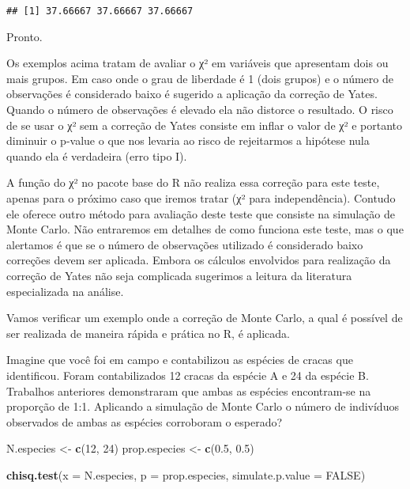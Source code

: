\documentclass[]{book}
\newenvironment{Shaded}{\begin{snugshade}}{\end{snugshade}}
\newcommand{\DataTypeTok}[1]{\textcolor[rgb]{0.13,0.29,0.53}{#1}}
\newcommand{\DecValTok}[1]{\textcolor[rgb]{0.00,0.00,0.81}{#1}}
\newcommand{\FloatTok}[1]{\textcolor[rgb]{0.00,0.00,0.81}{#1}}
\newcommand{\KeywordTok}[1]{\textcolor[rgb]{0.13,0.29,0.53}{\textbf{#1}}}
\newcommand{\NormalTok}[1]{#1}
\newcommand{\OtherTok}[1]{\textcolor[rgb]{0.56,0.35,0.01}{#1}}
\newcommand{\StringTok}[1]{\textcolor[rgb]{0.31,0.60,0.02}{#1}}
\begin{document}
\begin{verbatim}
## [1] 37.66667 37.66667 37.66667
\end{verbatim}

Pronto.

Os exemplos acima tratam de avaliar o χ² em variáveis que apresentam dois ou mais grupos. Em caso onde o grau de liberdade é 1 (dois grupos) e o número de observações é considerado baixo é sugerido a aplicação da correção de Yates. Quando o número de observações é elevado ela não distorce o resultado. O risco de se usar o χ² sem a correção de Yates consiste em inflar o valor de χ² e portanto diminuir o p-value o que nos levaria ao risco de rejeitarmos a hipótese nula quando ela é verdadeira (erro tipo I).

A função do χ² no pacote base do R não realiza essa correção para este teste, apenas para o próximo caso que iremos tratar (χ² para independência). Contudo ele oferece outro método para avaliação deste teste que consiste na simulação de Monte Carlo. Não entraremos em detalhes de como funciona este teste, mas o que alertamos é que se o número de observações utilizado é considerado baixo correções devem ser aplicada. Embora os cálculos envolvidos para realização da correção de Yates não seja complicada sugerimos a leitura da literatura especializada na análise.

Vamos verificar um exemplo onde a correção de Monte Carlo, a qual é possível de ser realizada de maneira rápida e prática no R, é aplicada.

Imagine que você foi em campo e contabilizou as espécies de cracas que identificou. Foram contabilizados 12 cracas da espécie A e 24 da espécie B. Trabalhos anteriores demonstraram que ambas as espécies encontram-se na proporção de 1:1. Aplicando a simulação de Monte Carlo o número de indivíduos observados de ambas as espécies corroboram o esperado?

\begin{Shaded}
\begin{Highlighting}[]
\NormalTok{N.especies <-}\StringTok{ }\KeywordTok{c}\NormalTok{(}\DecValTok{12}\NormalTok{, }\DecValTok{24}\NormalTok{)}
\NormalTok{prop.especies <-}\StringTok{ }\KeywordTok{c}\NormalTok{(}\FloatTok{0.5}\NormalTok{, }\FloatTok{0.5}\NormalTok{)}

\KeywordTok{chisq.test}\NormalTok{(}\DataTypeTok{x =}\NormalTok{ N.especies, }\DataTypeTok{p =}\NormalTok{ prop.especies, }\DataTypeTok{simulate.p.value =} \OtherTok{FALSE}\NormalTok{)}
\end{Highlighting}
\end{Shaded}
\end{document}
